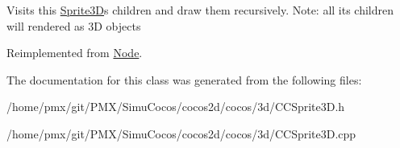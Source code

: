 Visits this \hyperlink{classSprite3D}{Sprite3D}\textquotesingle{}s children and draw them recursively. Note\+: all its children will rendered as 3D objects 

Reimplemented from \hyperlink{classNode_a7d794a5e30745611ec33881a625edf26}{Node}.



The documentation for this class was generated from the following files\+:\begin{DoxyCompactItemize}
\item 
/home/pmx/git/\+P\+M\+X/\+Simu\+Cocos/cocos2d/cocos/3d/C\+C\+Sprite3\+D.\+h\item 
/home/pmx/git/\+P\+M\+X/\+Simu\+Cocos/cocos2d/cocos/3d/C\+C\+Sprite3\+D.\+cpp\end{DoxyCompactItemize}
